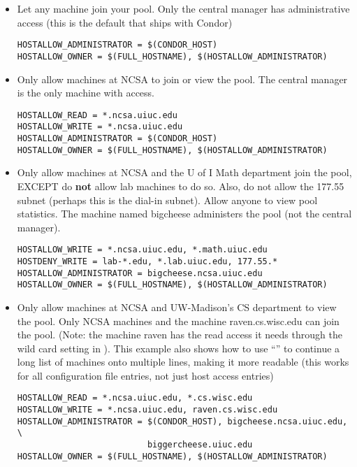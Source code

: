 \begin{itemize}

\item Let any machine join your pool.
Only the central manager has
administrative access (this is the default that ships with Condor)
\footnotesize
\begin{verbatim}
HOSTALLOW_ADMINISTRATOR = $(CONDOR_HOST)
HOSTALLOW_OWNER = $(FULL_HOSTNAME), $(HOSTALLOW_ADMINISTRATOR)
\end{verbatim}
\normalsize

\item Only allow machines at NCSA to join or view the pool.
The central manager is the only machine with  access.
\footnotesize
\begin{verbatim}
HOSTALLOW_READ = *.ncsa.uiuc.edu
HOSTALLOW_WRITE = *.ncsa.uiuc.edu
HOSTALLOW_ADMINISTRATOR = $(CONDOR_HOST)
HOSTALLOW_OWNER = $(FULL_HOSTNAME), $(HOSTALLOW_ADMINISTRATOR)
\end{verbatim}
\normalsize

\item Only allow machines at NCSA and the U of I Math department join the
pool, EXCEPT do \textbf{not} allow lab machines to do so.
Also, do not
allow the 177.55 subnet (perhaps this is the dial-in subnet).
Allow anyone to view pool statistics.  The machine named
bigcheese administers the pool (not the central manager).
\footnotesize
\begin{verbatim}
HOSTALLOW_WRITE = *.ncsa.uiuc.edu, *.math.uiuc.edu
HOSTDENY_WRITE = lab-*.edu, *.lab.uiuc.edu, 177.55.*
HOSTALLOW_ADMINISTRATOR = bigcheese.ncsa.uiuc.edu
HOSTALLOW_OWNER = $(FULL_HOSTNAME), $(HOSTALLOW_ADMINISTRATOR)
\end{verbatim}
\normalsize

\item Only allow machines at NCSA and UW-Madison's CS department to
view the pool.  Only NCSA machines and the machine raven.cs.wisc.edu can join
the pool.
(Note: the machine raven has the read access it needs through the
wild card setting in ).
This example also shows
how to use ``\verb@\@'' to continue a long list of machines
onto multiple lines, making it more readable (this works for all
configuration file entries, not just host access entries)
\footnotesize
\begin{verbatim}
HOSTALLOW_READ = *.ncsa.uiuc.edu, *.cs.wisc.edu
HOSTALLOW_WRITE = *.ncsa.uiuc.edu, raven.cs.wisc.edu
HOSTALLOW_ADMINISTRATOR = $(CONDOR_HOST), bigcheese.ncsa.uiuc.edu, \
                          biggercheese.uiuc.edu
HOSTALLOW_OWNER = $(FULL_HOSTNAME), $(HOSTALLOW_ADMINISTRATOR)
\end{verbatim}
\normalsize


\end{itemize}
